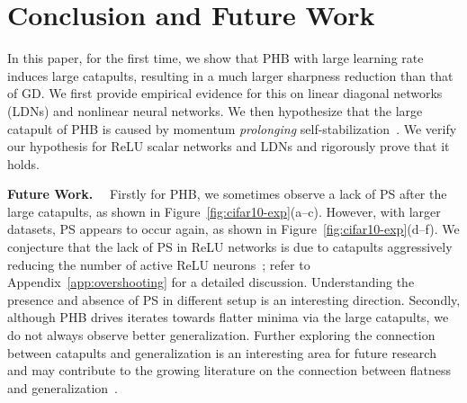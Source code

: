 \vspace*{-3pt}
\section{Conclusion and Future Work}
\vspace*{-3pt}
In this paper, for the first time, we show that PHB with large learning rate induces large catapults, resulting in a much larger sharpness reduction than that of GD.
We first provide empirical evidence for this on linear diagonal networks (LDNs) and nonlinear neural networks.
We then hypothesize that the large catapult of PHB is caused by momentum {\it prolonging} self-stabilization~\citep{damian2023stabilization}.
We verify our hypothesis for ReLU scalar networks and LDNs and rigorously prove that it holds.


\noindent\textbf{Future Work.}~~
Firstly for PHB, we sometimes observe a lack of PS after the large catapults, as shown in Figure~\ref{fig:cifar10-exp}(a--c). However, with larger datasets, PS appears to occur again, as shown in Figure~\ref{fig:cifar10-exp}(d--f). We conjecture that the lack of PS in ReLU networks is due to catapults aggressively reducing the number of active ReLU neurons~\citep{lu2020dying,andriushchenko2023sam}; refer to Appendix~\ref{app:overshooting} for a detailed discussion. Understanding the presence and absence of PS in different setup is an interesting direction.
Secondly, although PHB drives iterates towards flatter minima via the large catapults, we do not always observe better generalization.
Further exploring the connection between catapults and generalization is an interesting area for future research and may contribute to the growing literature on the connection between flatness and generalization~\citep{hochreiter1997flat,dinh2017sharp,even2023diagonal,andriushchenko2023sharpness}.

